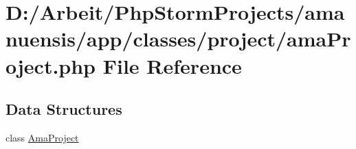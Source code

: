 \hypertarget{a00100}{}\section{D\+:/\+Arbeit/\+Php\+Storm\+Projects/amanuensis/app/classes/project/ama\+Project.php File Reference}
\label{a00100}
\subsection*{Data Structures}
\begin{DoxyCompactItemize}
\item 
class \hyperlink{a00008}{Ama\+Project}
\end{DoxyCompactItemize}
